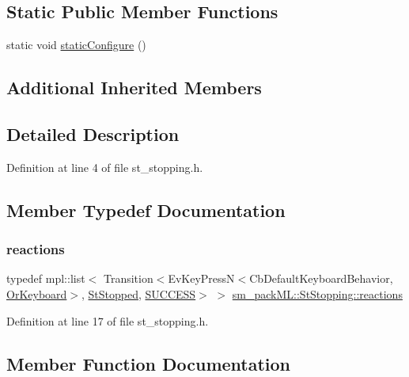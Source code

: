 \subsection*{Static Public Member Functions}
\begin{DoxyCompactItemize}
\item 
static void \hyperlink{structsm__packML_1_1StStopping_a58aa3dd672aeb0496ce2047da298c611}{static\+Configure} ()
\end{DoxyCompactItemize}
\subsection*{Additional Inherited Members}


\subsection{Detailed Description}


Definition at line 4 of file st\+\_\+stopping.\+h.



\subsection{Member Typedef Documentation}
\mbox{\label{structsm__packML_1_1StStopping_af103eed37e68bd7a728c921ec58a2942}} 
\subsubsection{\texorpdfstring{reactions}{reactions}}
{\footnotesize\ttfamily typedef mpl\+::list$<$ Transition$<$Ev\+Key\+PressN$<$Cb\+Default\+Keyboard\+Behavior, \hyperlink{classsm__packML_1_1OrKeyboard}{Or\+Keyboard}$>$, \hyperlink{structsm__packML_1_1StStopped}{St\+Stopped}, \hyperlink{classSUCCESS}{S\+U\+C\+C\+E\+SS}$>$ $>$ \hyperlink{structsm__packML_1_1StStopping_af103eed37e68bd7a728c921ec58a2942}{sm\+\_\+pack\+M\+L\+::\+St\+Stopping\+::reactions}}



Definition at line 17 of file st\+\_\+stopping.\+h.



\subsection{Member Function Documentation}
\mbox{\label{structsm__packML_1_1StStopping_a806226c89b297d619906049ff04df11f}} 
